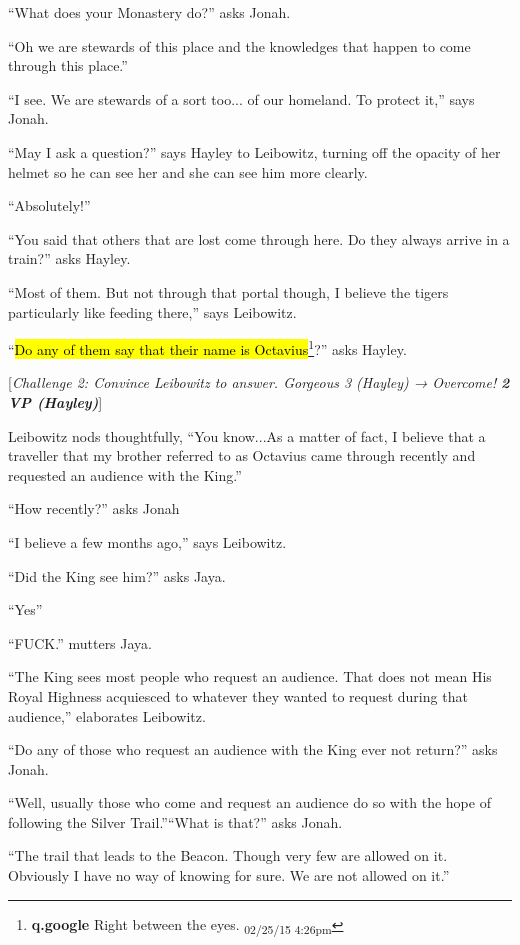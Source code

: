 ``What does your Monastery do?'' asks Jonah.

``Oh we are stewards of this place and the knowledges that happen to come through this place.''

``I see.   We are stewards of a sort too... of our homeland.  To protect it,'' says Jonah.



``May I ask a question?'' says Hayley to Leibowitz, turning off the opacity of her helmet so he can see her and she can see him more clearly.

``Absolutely!''

``You said that others that are lost come through here.  Do they always arrive in a train?'' asks Hayley.

``Most of them.  But not through that portal though, I believe the tigers particularly like feeding there,'' says Leibowitz.

``\hl{Do any of them say that their name is Octavius}\footnote{\textbf{q.google }Right between the eyes. \textsubscript{02/25/15 4:26pm}}?'' asks Hayley.

{[}\textit{Challenge 2: Convince Leibowitz to answer.  Gorgeous 3 (Hayley) → Overcome! }\textit{\textbf{2 VP (Hayley)}}{]}

Leibowitz nods thoughtfully, ``You know...As a matter of fact, I believe that a traveller that my brother referred to as Octavius came through recently and requested an audience with the King.''

``How recently?'' asks Jonah

``I believe a few months ago,'' says Leibowitz.

``Did the King see him?'' asks Jaya.

``Yes''

``FUCK.'' mutters Jaya.

``The King sees most people who request an audience. That does not mean His Royal Highness acquiesced to whatever they wanted to request during that audience,'' elaborates Leibowitz.

``Do any of those who request an audience with the King ever not return?'' asks Jonah.

``Well, usually those who come and request an audience do so with the hope of following the Silver Trail.''``What is that?'' asks Jonah.

``The trail that leads to the Beacon.  Though very few are allowed on it.  Obviously I have no way of knowing for sure.  We are not allowed on it.''

